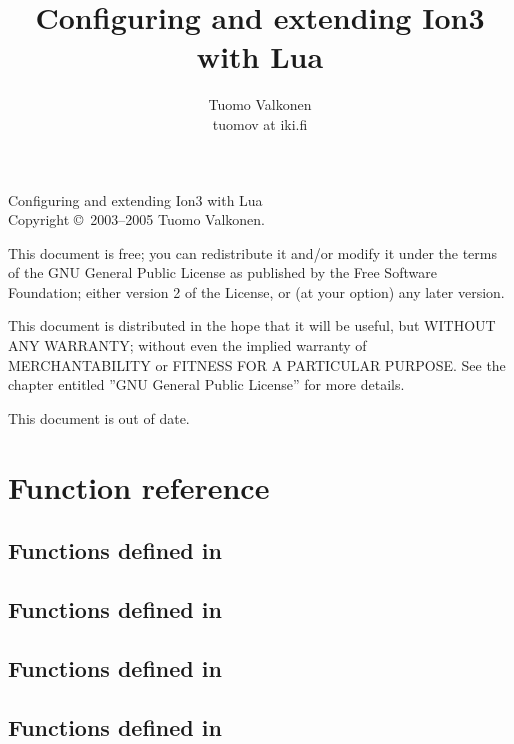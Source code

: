\documentclass[english,a4paper,11pt,oldtoc,mctitle]{rapport3}
\title{Configuring and extending Ion3 with Lua}
\author{Tuomo Valkonen \\ tuomov at iki.fi}
\begin{document}
\maketitle

Configuring and extending Ion3 with Lua\\
Copyright \copyright\  2003--2005 Tuomo Valkonen.

This document is free; you can redistribute it and/or modify
it under the terms of the GNU General Public License as published by
the Free Software Foundation; either version 2 of the License, or
(at your option) any later version.

This document is distributed in the hope that it will be useful,
but WITHOUT ANY WARRANTY; without even the implied warranty of
MERCHANTABILITY or FITNESS FOR A PARTICULAR PURPOSE.  See the
chapter entitled ''GNU General Public License'' for more details.

\tableofcontents

This document is out of date.











\chapter{Function reference}
\label{sec:exports}

\section{Functions defined in }
\label{sec:ioncoreref}


\section{Functions defined in }
\label{sec:ionwsref}


\section{Functions defined in }
\label{sec:floatwsref}


\section{Functions defined in }
\label{sec:panewsref}

\end{document}
